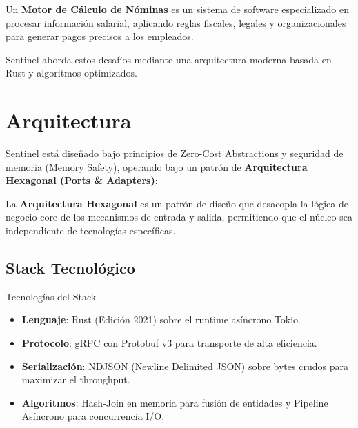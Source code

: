 \begin{definicion}
Un \textbf{Motor de Cálculo de Nóminas} es un sistema de software especializado en procesar información salarial, aplicando reglas fiscales, legales y organizacionales para generar pagos precisos a los empleados.
\end{definicion}

Sentinel aborda estos desafíos mediante una arquitectura moderna basada en Rust y algoritmos optimizados.

\section{Arquitectura}

Sentinel está diseñado bajo principios de Zero-Cost Abstractions y seguridad de memoria (Memory Safety), operando bajo un patrón de \textbf{Arquitectura Hexagonal (Ports \& Adapters)}:

\begin{definicion}
La \textbf{Arquitectura Hexagonal} es un patrón de diseño que desacopla la lógica de negocio core de los mecanismos de entrada y salida, permitiendo que el núcleo sea independiente de tecnologías específicas.
\end{definicion}


\subsection{Stack Tecnológico}

\begin{caja}{Tecnologías del Stack}
\begin{itemize}
\item \textbf{Lenguaje}: Rust (Edición 2021) sobre el runtime asíncrono Tokio.
\item \textbf{Protocolo}: gRPC con Protobuf v3 para transporte de alta eficiencia.
\item \textbf{Serialización}: NDJSON (Newline Delimited JSON) sobre bytes crudos para maximizar el throughput.
\item \textbf{Algoritmos}: Hash-Join en memoria para fusión de entidades y Pipeline Asíncrono para concurrencia I/O.
\end{itemize}
\end{caja}

